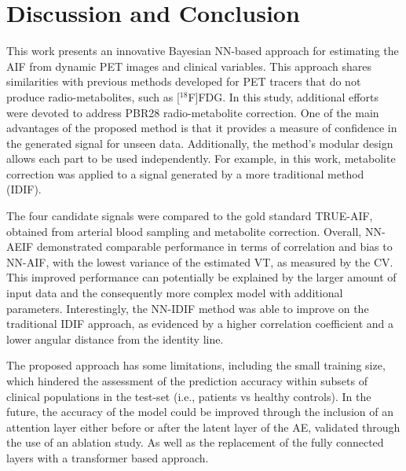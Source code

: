 \vspace{-0.3cm}

\section{Discussion and Conclusion} \label{sec:discussion}
    This work presents an innovative Bayesian \gls{NN}-based approach for estimating the \gls{AIF} from dynamic \gls{PET} images and clinical variables. This approach shares similarities with previous methods developed for \gls{PET} tracers that do not produce radio-metabolites, such as [$^{18}$F]\gls{FDG}. In this study, additional efforts were devoted to address \gls{PBR28} radio-metabolite correction. One of the main advantages of the proposed method is that it provides a measure of confidence in the generated signal for unseen data. Additionally, the method's modular design allows each part to be used independently. For example, in this work, metabolite correction was applied to a signal generated by a more traditional method (\gls{IDIF}). 
    
    The four candidate signals were compared to the gold standard TRUE-\gls{AIF}, obtained from arterial blood sampling and metabolite correction. Overall, \gls{NN}-\gls{AE}\gls{IF} demonstrated comparable performance in terms of correlation and bias to \gls{NN}-\gls{AIF}, with the lowest variance of the estimated \gls{VT}, as measured by the \gls{CV}. This improved performance can potentially be explained by the larger amount of input data and the consequently more complex model with additional parameters. Interestingly, the \gls{NN}-\gls{IDIF} method was able to improve on the traditional \gls{IDIF} approach, as evidenced by a higher correlation coefficient and a lower angular distance from the identity line.
    
    The proposed approach has some limitations, including the small training size, which hindered the assessment of the prediction accuracy within subsets of clinical populations in the test-set (i.e., patients vs healthy controls). In the future, the accuracy of the model could be improved through the inclusion of an attention layer either before or after the latent layer of the \gls{AE}, validated through the use of an ablation study. As well as the replacement of the fully connected layers with a transformer based approach.
